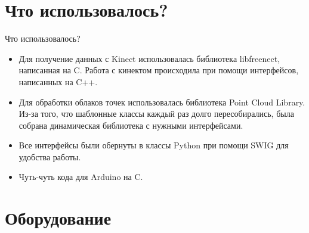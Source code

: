 \documentclass{beamer}
\begin{document}
\section{Что использовалось?}

\begin{frame}{Что использовалось?}
    \begin{itemize}
        \item Для получение данных с Kinect использовалась библиотека libfreenect, написанная на C. Работа с кинектом происходила при помощи интерфейсов, написанных на C++.
        \item Для обработки облаков точек использовалась библиотека Point Cloud Library. Из-за того, что шаблонные классы каждый раз долго пересобирались, была собрана динамическая библиотека с нужными интерфейсами.
        \item Все интерфейсы были обернуты в классы Python при помощи SWIG для удобства работы.
        \item Чуть-чуть кода для Arduino на C.
    \end{itemize}
\end{frame}


\section{Оборудование}
\end{document}
